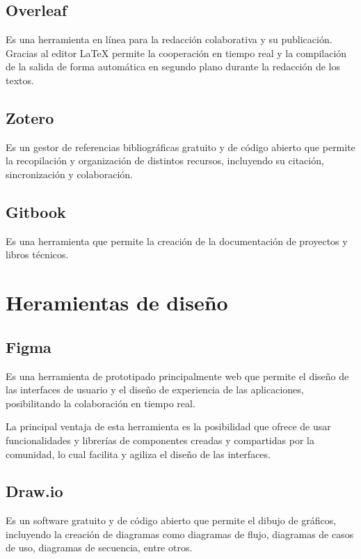 \subsection{Overleaf}
\cite{Overleaf_bib} Es una herramienta en línea para la redacción colaborativa y su publicación. Gracias al editor LaTeX permite la cooperación en tiempo real y la compilación de la salida de forma automática en segundo plano durante la redacción de los textos.

\subsection{Zotero}
\cite{Zotero_bib} Es un gestor de referencias bibliográficas gratuito y de código abierto que permite la recopilación y organización de distintos recursos, incluyendo su citación, sincronización y colaboración. 

\subsection{Gitbook}
\cite{gitbook} Es una herramienta que permite la creación de la documentación de proyectos y libros técnicos.

\section{Heramientas de diseño}
\subsection{Figma}
\cite{Figma1_bib} Es una herramienta de prototipado principalmente web que permite el diseño de las interfaces de usuario y el diseño de experiencia de las aplicaciones, posibilitando la colaboración en tiempo real.

\cite{Figma2_bib} La principal ventaja de esta herramienta es la posibilidad que ofrece de usar funcionalidades y librerías de componentes creadas y compartidas por la comunidad, lo cual facilita y agiliza el diseño de las interfaces.

\subsection{Draw.io}
\cite{drawio_bib} Es un software gratuito y de código abierto que permite el dibujo de gráficos, incluyendo la creación de diagramas como diagramas de flujo, diagramas de casos de uso, diagramas de secuencia, entre otros.

